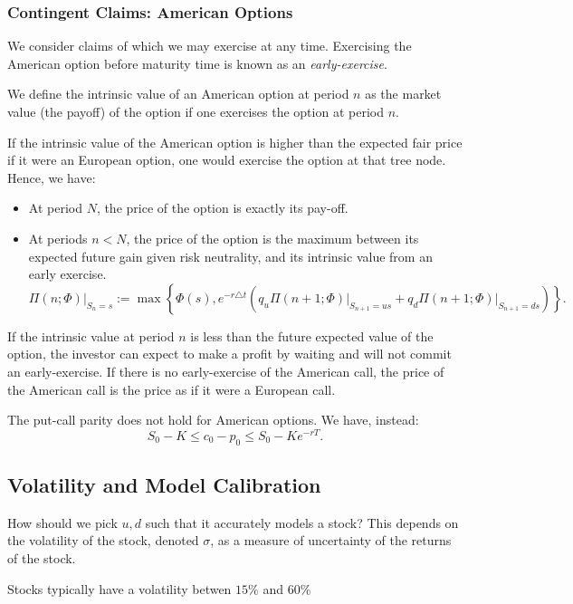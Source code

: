 \subsubsection{Contingent Claims: American Options}
We consider claims of which we may exercise at any time. Exercising the
American option before maturity time is known as an \textit{early-exercise}.
\begin{definition}
  We define the intrinsic value of an American option at period $n$ as the
  market value (the payoff) of the option if one exercises the option at period
  $n$.
\end{definition}
If the intrinsic value of the American option is higher than the expected fair
price if it were an European option, one would exercise the option at that tree
node. Hence, we have:
\begin{itemize}
  \item At period $N$, the price of the option is exactly its pay-off.\\
  \item At periods $n<N$, the price of the option is the maximum between its
    expected future gain given risk neutrality, and its intrinsic value from an
    early exercise.
\[\left.\Pi\left( n;\Phi \right)\right|_{S_{n}=s}:=\max \left\{ \Phi(s),e^{-r\triangle t}\left( q_u\left.\Pi\left( n+1;\Phi \right) \right|_{S_{n+1}=us} + q_d\left.\Pi\left( n+1;\Phi \right) \right|_{S_{n+1}=ds}\right) \right\}.\] 
\end{itemize}
If the intrinsic value at period $n$ is less than the future expected value of
the option, the investor can expect to make a profit by waiting and will not
commit an early-exercise. If there is no early-exercise of the American call,
the price of the American call is the price as if it were a European call.
\begin{remark}
  The put-call parity does not hold for American options. We have, instead:
  \[S_0-K\le c_0-p_0\le S_0-Ke^{-rT}.\] 
\end{remark}

\subsection{Volatility and Model Calibration}
How should we pick $u,d$ such that it accurately models a stock? This depends
on the volatility of the stock, denoted $\sigma$, as a measure of uncertainty
of the returns of the stock.
\begin{remark}
  Stocks typically have a volatility betwen $15\%$ and $60\%$
\end{remark}

